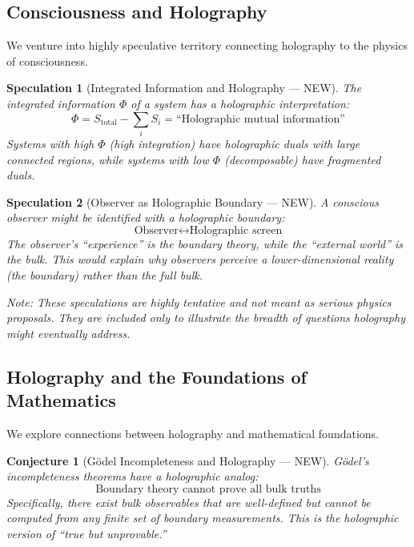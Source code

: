 \documentclass[12pt,a4paper]{article}
\newtheorem{conjecture}[theorem]{Conjecture}
\newtheorem*{speculation}{Speculation}
\begin{document}
\subsection{Consciousness and Holography}

We venture into highly speculative territory connecting holography to the physics of consciousness.

\begin{speculation}[Integrated Information and Holography --- NEW]
The integrated information $\Phi$ of a system has a holographic interpretation:
\begin{equation}
\Phi = S_{\text{total}} - \sum_i S_i = \text{``Holographic mutual information''}
\end{equation}
Systems with high $\Phi$ (high integration) have holographic duals with large connected regions, while systems with low $\Phi$ (decomposable) have fragmented duals.
\end{speculation}

\begin{speculation}[Observer as Holographic Boundary --- NEW]
A conscious observer might be identified with a holographic boundary:
\begin{equation}
\text{Observer} \leftrightarrow \text{Holographic screen}
\end{equation}
The observer's ``experience'' is the boundary theory, while the ``external world'' is the bulk. This would explain why observers perceive a lower-dimensional reality (the boundary) rather than the full bulk.
\end{speculation}

\textit{Note: These speculations are highly tentative and not meant as serious physics proposals. They are included only to illustrate the breadth of questions holography might eventually address.}

\subsection{Holography and the Foundations of Mathematics}

We explore connections between holography and mathematical foundations.

\begin{conjecture}[G\"odel Incompleteness and Holography --- NEW]
G\"odel's incompleteness theorems have a holographic analog:
\begin{equation}
\text{Boundary theory cannot prove all bulk truths}
\end{equation}
Specifically, there exist bulk observables that are well-defined but cannot be computed from any finite set of boundary measurements. This is the holographic version of ``true but unprovable.''
\end{conjecture}
\end{document}

